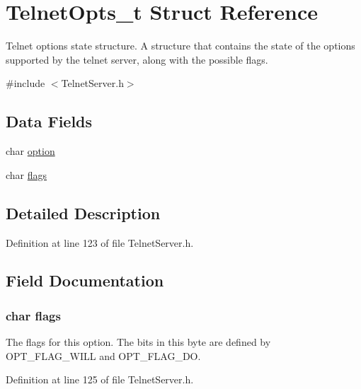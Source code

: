 \hypertarget{struct_telnet_opts__t}{\section{Telnet\-Opts\-\_\-t Struct Reference}
\label{struct_telnet_opts__t}
}


Telnet options state structure. A structure that contains the state of the options supported by the telnet server, along with the possible flags.  




{\ttfamily \#include $<$Telnet\-Server.\-h$>$}

\subsection*{Data Fields}
\begin{DoxyCompactItemize}
\item 
char \hyperlink{struct_telnet_opts__t_a454fa9de3ca009e3082488412cd184d4}{option}
\item 
char \hyperlink{struct_telnet_opts__t_a639870aa0bd3049b341f02dd37e02f1f}{flags}
\end{DoxyCompactItemize}


\subsection{Detailed Description}


Definition at line 123 of file Telnet\-Server.\-h.



\subsection{Field Documentation}
\hypertarget{struct_telnet_opts__t_a639870aa0bd3049b341f02dd37e02f1f}{
\subsubsection[{flags}]{\setlength{\rightskip}{0pt plus 5cm}char flags}}\label{struct_telnet_opts__t_a639870aa0bd3049b341f02dd37e02f1f}
The flags for this option. The bits in this byte are defined by O\-P\-T\-\_\-\-F\-L\-A\-G\-\_\-\-W\-I\-L\-L and O\-P\-T\-\_\-\-F\-L\-A\-G\-\_\-\-D\-O. 

Definition at line 125 of file Telnet\-Server.\-h.

